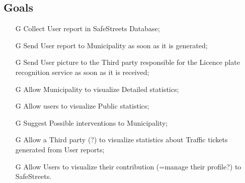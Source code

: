 \documentclass[../../rasd.tex]{subfiles}
\begin{document}
\subsection{Goals}
\begin{itemize}
	\item[G\subs{1}]Collect User report in SafeStreets Database;
	\item[G\subs{2}]Send User report to Municipality as soon as it is generated;
	\item[G\subs{3}]Send User picture to the Third party responsible for the Licence plate recognition service as soon as it is received;
	\item[G\subs{4}]Allow Municipality to visualize Detailed statistics;
	\item[G\subs{5}]Allow users to visualize Public statistics;
	\item[G\subs{6}]Suggest Possible interventions to Municipality;
	\item[G\subs{7}]Allow a Third party (?) to visualize statistics about Traffic tickets generated from User reports;
	\item[G\subs{8}]Allow Users to visualize their contribution (=manage their profile?) to SafeStreets.
\end{itemize}
\end{document}
